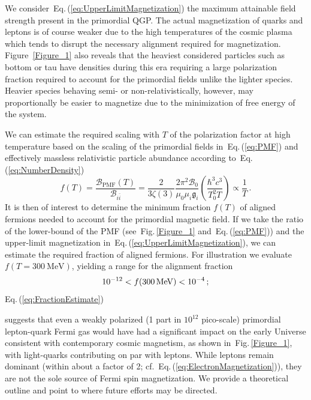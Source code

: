 \documentclass[epjST]{svjour}
\newcommand*{\MeV}{\text{\,MeV}}
\newcommand{\req}[1]{Eq.\,(\ref{#1})}
\newcommand{\rf}[1]{Fig.\,{\ref{#1}}}
\begin{document}
{\color{blue}We consider~\req{eq:UpperLimitMagnetization} the maximum attainable field strength present in the primordial QGP. The actual magnetization of quarks and leptons is of course weaker due to the high temperatures of the cosmic plasma which tends to disrupt the necessary alignment required for magnetization. Figure~\ref{Figure_1} also reveals that the heaviest considered particles such as bottom or tau have densities during this era requiring a large polarization fraction required to account for the primordial fields unlike the lighter species. Heavier species behaving semi- or non-relativistically, however, may proportionally be easier to magnetize due to the minimization of free energy of the system.

We can estimate the required scaling with $T$ of the polarization factor at high temperature based on the scaling of the primordial fields in~\req{eq:PMF} and effectively massless relativistic particle abundance according to~\req{eq:NumberDensity}
\begin{equation}
\label{eq:FractionAligned}
f(T) = \frac{\mathcal{B}_\mathrm{PMF}(T)}{\mathcal{B}_{i\bar{i}}} 
= \frac{2}{3\zeta(3)}\frac{2\pi^{2}\mathcal{B}_{0}}{\mu_{0}\mu_{i}\mathfrak{g}_{i}}\left(\frac{\hbar^{3}c^{3}}{T_{0}^{2}T}\right)\propto\frac{1}{T}\,.
\end{equation}
It is then of interest to determine the minimum fraction \(f(T)\) of aligned fermions needed to account for the primordial magnetic field. If we take the ratio of the lower-bound of the PMF (see~\rf{Figure_1} and~\req{eq:PMF}) and the upper-limit magnetization in~\req{eq:UpperLimitMagnetization}, we can estimate the required fraction of aligned fermions. For illustration we evaluate \(f(T=300~\mathrm{MeV})\), yielding a range for the alignment fraction
\begin{equation}
\label{eq:FractionEstimate}
10^{-12} < f(300\MeV) < 10^{-4}\,;
\end{equation}
\req{eq:FractionEstimate}} suggests that even a weakly polarized ({\color{blue}1 part in $10^{12}$} pico-scale) primordial lepton-quark Fermi gas would have had a significant impact on the early Universe consistent with contemporary cosmic magnetism, as shown in~\rf{Figure_1}, with light-quarks contributing on par with leptons. While leptons remain dominant (within about a factor of 2; cf.~\req{eq:ElectronMagnetization}), they are not the sole source of Fermi spin magnetization. We provide a theoretical outline and point to where future efforts may be directed.
\end{document}
